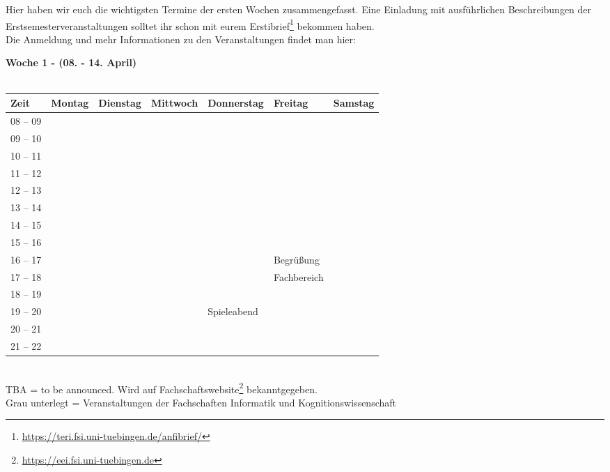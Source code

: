 
Hier haben wir euch die wichtigsten Termine der ersten Wochen
zusammengefasst. Eine Einladung mit ausführlichen Beschreibungen der
Erstsemesterveranstaltungen solltet ihr schon mit eurem
Erstibrief\footnote{\url{https://teri.fsi.uni-tuebingen.de/anfibrief/}}
bekommen haben.\\
Die Anmeldung und mehr Informationen zu den Veranstaltungen findet man hier:\\

\newcommand{\event}{\cellcolor{lightlightgray}}


\textbf{Woche 1 - (08. - 14. April)}\\
\\
\begin{tabular}{|l|p{}|p{}|p{}|p{}|p{}|p{}|} \hline
 Zeit & Montag & Dienstag & Mittwoch & Donnerstag & Freitag & Samstag \\ 
 \hline \hline
 08 -- 09 & & & & & &  \\ \cline{1-1} 
 09 -- 10 & & & & & &  \\ \cline{1-1}
 10 -- 11 & & & & & &  \\ \cline{1-1}
 11 -- 12 & & & & & &  \\ \cline{1-1}
 12 -- 13 & & & & & &  \\ \cline{1-1} 
 13 -- 14 & & & & & &  \\ \cline{1-1}
 14 -- 15 & & & & & &  \\ \cline{1-1}
 15 -- 16 & & & & & &  \\ \cline{1-1}
 16 -- 17 & & & & &\scriptsize Begrüßung &  \\ \cline{1-1}
 17 -- 18 & & & & & \scriptsize Fachbereich &  \\ \cline{1-1} 	
 18 -- 19 & & & & & &   \\ \cline{1-1}
 19 -- 20 & & & &\cellcolor{lightlightgray} \footnotesize{Spieleabend} & \cellcolor{lightlightgray}&   \\ \cline{1-1}
 20 -- 21 & & & &\cellcolor{lightlightgray} & \cellcolor{lightlightgray}&  \\ \cline{1-1}
 21 -- 22 & & & &\cellcolor{lightlightgray} & \cellcolor{lightlightgray}& \\ \hline
 \end{tabular}
\\
{\scriptsize TBA = to be announced. Wird auf Fachschaftswebsite\footnote{\url{https://eei.fsi.uni-tuebingen.de}}  bekanntgegeben.} \\
{\scriptsize Grau unterlegt = Veranstaltungen der Fachschaften Informatik und Kognitionswissenschaft }
\vfill

